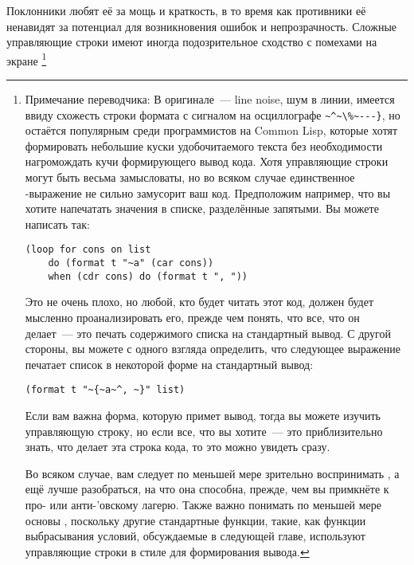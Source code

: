 Поклонники  любят её за мощь и краткость, в то время как противники её
ненавидят за потенциал для возникновения ошибок и непрозрачность. Сложные управляющие
строки  имеют иногда подозрительное сходство с помехами на экране
\footnote{Примечание переводчика: В оригинале~--- line noise, шум в линии, имеется ввиду
  схожесть строки формата с сигналом на осциллографе \lstinline!~^~\%~---}!, но
 остаётся популярным среди программистов на Common Lisp, которые хотят
формировать небольшие куски удобочитаемого текста без необходимости нагромождать кучи
формирующего вывод кода. Хотя управляющие строки  могут быть весьма
замысловаты, но во всяком случае единственное -выражение не сильно замусорит
ваш код. Предположим например, что вы хотите напечатать значения в списке, разделённые
запятыми. Вы можете написать так:

\begin{lstlisting}
(loop for cons on list
    do (format t "~a" (car cons))
    when (cdr cons) do (format t ", "))
\end{lstlisting}

Это не очень плохо, но любой, кто будет читать этот код, должен будет мысленно
проанализировать его, прежде чем понять, что все, что он делает~--- это печать содержимого
списка  на стандартный вывод. С другой стороны, вы можете с одного взгляда
определить, что следующее выражение печатает список в некоторой форме на стандартный
вывод:

\begin{lstlisting}
(format t "~{~a~^, ~}" list)
\end{lstlisting}

Если вам важна форма, которую примет вывод, тогда вы можете изучить управляющую строку, но
если все, что вы хотите~--- это приблизительно знать, что делает эта строка кода, то это
можно увидеть сразу.

Во всяком случае, вам следует по меньшей мере зрительно воспринимать , а ещё
лучше разобраться, на что она способна, прежде, чем вы примкнёте к про- или
анти-'овскому лагерю. Также важно понимать по меньшей мере основы
, поскольку другие стандартные функции, такие, как функции выбрасывания
условий, обсуждаемые в следующей главе, используют управляющие строки в стиле
 для формирования вывода.

}

